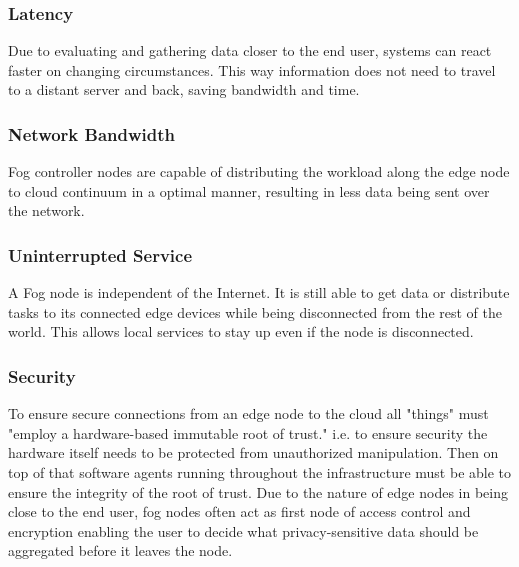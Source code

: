 
\subsubsection{Latency}

Due to evaluating and gathering data closer to the end user, systems can react faster on changing circumstances. This way information does not need to travel to a distant server and back, saving bandwidth and time.

\subsubsection{Network Bandwidth}

Fog controller nodes are capable of distributing the workload along the edge node to cloud continuum in a optimal manner, resulting in less data being sent over the network.


\subsubsection{Uninterrupted Service}

A Fog node is independent of the Internet. It is still able to get data or distribute tasks to its connected edge devices while being disconnected from the rest of the world. This allows local services to stay up even if the node is disconnected.

\subsubsection{Security}

To ensure secure connections from an edge node to the cloud all "things" must "employ a hardware-based immutable root of trust."\cite[p.10]{OpenFog} i.e. to ensure security the hardware itself needs to be protected from unauthorized manipulation. Then on top of that software agents running throughout the infrastructure must be able to ensure the integrity of the root of trust. Due to the nature of edge nodes in being close to the end user, fog nodes often act as first node of access control and encryption enabling the user to decide what privacy-sensitive data should be aggregated before it leaves the node.\cite[p.10]{OpenFog}